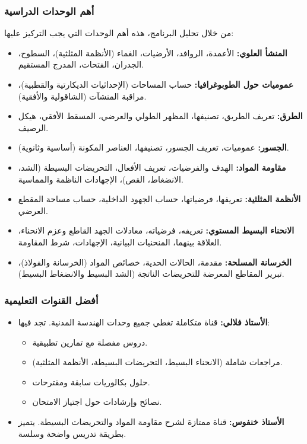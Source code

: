 \documentclass[12pt,a4paper]{book}
\begin{document}
\subsubsection{أهم الوحدات الدراسية}

من خلال تحليل البرنامج، هذه أهم الوحدات التي يجب التركيز عليها:

\begin{itemize}
	\item \textbf{المنشأ العلوي:} الأعمدة، الروافد، الأرضيات، الغماء (الأنظمة المثلثية)، السطوح، الجدران، الفتحات، المدرج المستقيم.
	\item \textbf{عموميات حول الطوبوغرافيا:} حساب المساحات (الإحداثيات الديكارتية والقطبية)، مراقبة المنشآت (الشاقولية والأفقية).
	\item \textbf{الطرق:} تعريف الطريق، تصنيفها، المظهر الطولي والعرضي، المسقط الأفقي، هيكل الرصيف.
	\item \textbf{الجسور:} عموميات، تعريف الجسور، تصنيفها، العناصر المكونة (أساسية وثانوية).
	\item \textbf{مقاومة المواد:} الهدف والفرضيات، تعريف الأفعال، التحريضات البسيطة (الشد، الانضغاط، القص)، الإجهادات الناظمة والمماسية.
	\item \textbf{الأنظمة المثلثية:} تعريفها، فرضياتها، حساب الجهود الداخلية، حساب مساحة المقطع العرضي.
	\item \textbf{الانحناء البسيط المستوي:} تعريفه، فرضياته، معادلات الجهد القاطع وعزم الانحناء، العلاقة بينهما، المنحنيات البيانية، الإجهادات، شرط المقاومة.
	\item \textbf{الخرسانة المسلحة:} مقدمة، الحالات الحدية، خصائص المواد (الخرسانة والفولاذ)، تبرير المقاطع المعرضة للتحريضات الناتجة (الشد البسيط والانضغاط البسيط).
\end{itemize}

\subsubsection{أفضل القنوات التعليمية}

\begin{itemize}
	\item \textbf{الأستاذ فلالي:} قناة متكاملة تغطي جميع وحدات الهندسة المدنية. تجد فيها:
	\begin{itemize}
		\item دروس مفصلة مع تمارين تطبيقية.
		\item مراجعات شاملة (الانحناء البسيط، التحريضات البسيطة، الأنظمة المثلثية).
		\item حلول بكالوريات سابقة ومقترحات.
		\item نصائح وإرشادات حول اجتياز الامتحان.
	\end{itemize}
	\item \textbf{الأستاذ خنفوس:} قناة ممتازة لشرح مقاومة المواد والتحريضات البسيطة. يتميز بطريقة تدريس واضحة وسلسة.
\end{itemize}
\end{document}
